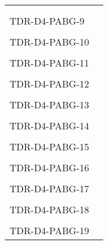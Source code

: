 \begin{longtable}{|p{2cm}|p{12cm}|@{}}
\begin{minipage}{12cm}
\end{minipage}\\
\\
\hline  
TDR-D4-PABG-9&
\begin{minipage}{12cm}
\end{minipage}\\
\\
\hline  
TDR-D4-PABG-10&
\begin{minipage}{12cm}
\end{minipage}\\
\\
\hline  
TDR-D4-PABG-11&
\begin{minipage}{12cm}
\end{minipage}\\
\\
\hline  
TDR-D4-PABG-12&
\begin{minipage}{12cm}
\end{minipage}\\
\\
\hline  
TDR-D4-PABG-13&
\begin{minipage}{12cm}
\end{minipage}\\
\\
\hline  
TDR-D4-PABG-14&
\begin{minipage}{12cm}
\end{minipage}\\
\\
\hline  
TDR-D4-PABG-15&
\begin{minipage}{12cm}
\end{minipage}\\
\\
\hline  
TDR-D4-PABG-16&
\begin{minipage}{12cm}
\end{minipage}\\
\\
\hline  
TDR-D4-PABG-17&
\begin{minipage}{12cm}
\end{minipage}\\
\\
\hline                                    
TDR-D4-PABG-18&
\begin{minipage}{12cm}
\end{minipage}\\
\\
\hline  
TDR-D4-PABG-19&
\begin{minipage}{12cm}
\end{minipage}\\

\end{longtable}
